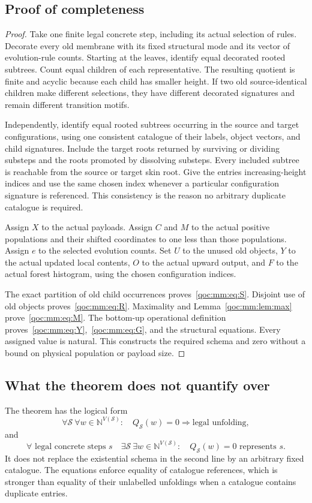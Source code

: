 \documentclass[11pt,letterpaper]{article}
\theoremstyle{definition}
\theoremstyle{remark}
\newcommand{\N}{\mathbb N}
\begin{document}
\subsection{Proof of completeness}
\begin{proof}
Take one finite legal concrete step, including its actual selection of rules. Decorate every old membrane with its fixed structural mode and its vector of evolution-rule counts. Starting at the leaves, identify equal decorated rooted subtrees. Count equal children of each representative. The resulting quotient is finite and acyclic because each child has smaller height. If two old source-identical children make different selections, they have different decorated signatures and remain different transition motifs.

Independently, identify equal rooted subtrees occurring in the source and target configurations, using one consistent catalogue of their labels, object vectors, and child signatures. Include the target roots returned by surviving or dividing substeps and the roots promoted by dissolving substeps. Every included subtree is reachable from the source or target skin root. Give the entries increasing-height indices and use the same chosen index whenever a particular configuration signature is referenced. This consistency is the reason no arbitrary duplicate catalogue is required.

Assign $X$ to the actual payloads. Assign $C$ and $M$ to the actual positive populations and their shifted coordinates to one less than those populations. Assign $e$ to the selected evolution counts. Set $U$ to the unused old objects, $Y$ to the actual updated local contents, $O$ to the actual upward output, and $F$ to the actual forest histogram, using the chosen configuration indices.

The exact partition of old child occurrences proves~\eqref{qoc:mm:eq:S}. Disjoint use of old objects proves~\eqref{qoc:mm:eq:R}. Maximality and Lemma~\ref{qoc:mm:lem:max} prove~\eqref{qoc:mm:eq:M}. The bottom-up operational definition proves~\eqref{qoc:mm:eq:Y},~\eqref{qoc:mm:eq:G}, and the structural equations. Every assigned value is natural. This constructs the required schema and zero without a bound on physical population or payload size.
\end{proof}

\subsection{What the theorem does not quantify over}
The theorem has the logical form
\[
 \forall\mathcal S\ \forall w\in\N^{V(\mathcal S)}:
 \quad Q_{\mathcal S}(w)=0\Longrightarrow\text{legal unfolding},
\]
and
\[
 \forall\text{ legal concrete steps }s\quad
 \exists\mathcal S\ \exists w\in\N^{V(\mathcal S)}:
 \quad Q_{\mathcal S}(w)=0\text{ represents }s.
\]
It does not replace the existential schema in the second line by an arbitrary fixed catalogue. The equations enforce equality of catalogue references, which is stronger than equality of their unlabelled unfoldings when a catalogue contains duplicate entries.
\end{document}
